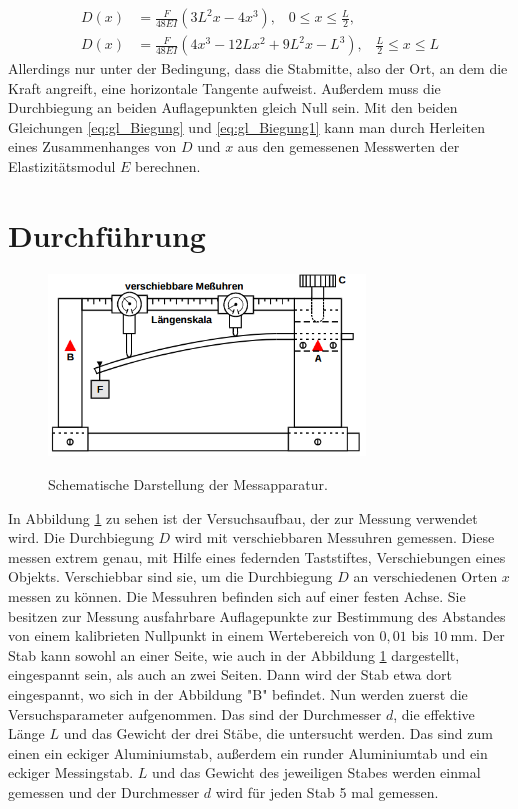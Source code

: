 \documentclass[
  bibliography=totoc,     %
  captions=tableheading,  %
  titlepage=firstiscover, %
]{scrartcl}
\begin{document}
\begin{align}
	D(x)&=\frac{F}{48EI}(3L^2x-4x^3), \;\;\; 0\leqslant  x\leqslant\frac{L}{2}\text{,}
    \label{eq:gl_Biegung1} \\
	D(x)&=\frac{F}{48EI}(4x^3-12Lx^2+9L^2x-L^3), \;\;\; \frac{L}{2}\leqslant  x\leqslant L
	\label{eq:gl_Biegung}
\end{align}
Allerdings nur unter der Bedingung, dass die Stabmitte, also der Ort, an dem die
Kraft angreift, eine horizontale Tangente aufweist. Außerdem muss die Durchbiegung
an beiden Auflagepunkten gleich Null sein. Mit den beiden Gleichungen
\ref{eq:gl_Biegung} und \ref{eq:gl_Biegung1} kann man durch Herleiten eines
Zusammenhanges von $D$ und $x$ aus den gemessenen Messwerten der
Elastizitätsmodul $E$ berechnen.
\newpage
\section{Durchführung}
\label{sec:durchführung}
\begin{figure}[H]
    \centering
    \caption{Schematische Darstellung der Messapparatur.}
    \includegraphics[width=0.75\textwidth]{V1033.png}
    \label{fig:1033}
\end{figure}
In Abbildung \ref{fig:1033} zu sehen ist der Versuchsaufbau, der zur Messung
verwendet wird. Die Durchbiegung $D$ wird mit verschiebbaren Messuhren gemessen.
Diese messen extrem genau, mit Hilfe eines federnden Taststiftes, Verschiebungen
eines Objekts. Verschiebbar sind sie, um die Durchbiegung $D$ an verschiedenen
Orten $x$ messen zu können. Die Messuhren befinden sich auf einer festen Achse.
Sie besitzen zur Messung ausfahrbare Auflagepunkte zur Bestimmung des Abstandes
von einem kalibrieten Nullpunkt in einem Wertebereich von $0,01$ bis $\SI{10}{\milli\meter}$.
Der Stab kann sowohl an einer Seite, wie auch in der Abbildung \ref{fig:1033}
dargestellt, eingespannt sein, als auch an zwei Seiten. Dann wird der Stab etwa
dort eingespannt, wo sich in der Abbildung "B" befindet.
Nun werden zuerst die Versuchsparameter aufgenommen. Das sind der Durchmesser
$d$, die effektive Länge $L$ und das Gewicht der drei Stäbe, die untersucht
werden. Das sind zum einen ein eckiger Aluminiumstab, außerdem ein runder
Aluminiumtab und ein eckiger Messingstab. $L$ und das Gewicht des jeweiligen
Stabes werden einmal gemessen und der Durchmesser $d$ wird für jeden Stab 5 mal
gemessen.
\end{document}
